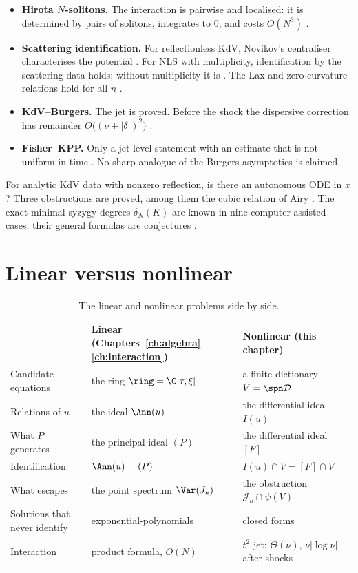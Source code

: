 \begin{itemize}
\item \textbf{Hirota $N$-solitons.} The interaction is pairwise and localised: it is determined by pairs of solitons, integrates to $0$, and costs $O(N^3)$  \proved.
\item \textbf{Scattering identification.} For reflectionless KdV, Novikov's centraliser characterises the potential  \proved. For NLS with multiplicity, identification by the scattering data holds; without multiplicity it is \falsest. The Lax and zero-curvature relations hold for all $n$  \proved.
\item \textbf{KdV--Burgers.} The jet is proved. Before the shock the dispersive correction has remainder $O\big((\nu+|\delta|)^2\big)$  .
\item \textbf{Fisher--KPP.} Only a jet-level statement with an estimate that is not uniform in time  \proved. No sharp analogue of the Burgers asymptotics is claimed.
\end{itemize}

\begin{caution}[title={Open in the nonlinear part}]
For analytic KdV data with nonzero reflection, is there an autonomous ODE in $x$? Three obstructions are proved, among them the cubic relation of Airy \openq{} . The exact minimal syzygy degrees $\delta_N(K)$ are known in nine computer-assisted cases; their general formulas are conjectures \openq{} .
\end{caution}

\section{Linear versus nonlinear}

\begin{table}[!htb]
\centering\small
\begin{tabular}{@{}L{3.0cm}L{5.8cm}L{5.8cm}@{}}
\toprule
 & Linear (Chapters~\ref{ch:algebra}--\ref{ch:interaction}) & Nonlinear (this chapter)\\\midrule
Candidate equations & the ring $\ring=\C[\tau,\xi]$ & a finite dictionary $V=\spn\mathcal D$\\
Relations of $u$ & the ideal $\Ann(u)$ & the differential ideal $I(u)$\\
What $P$ generates & the principal ideal $(P)$ & the differential ideal $[F]$\\
Identification & $\Ann(u)=(P)$ & $I(u)\cap V=[F]\cap V$\\
What escapes & the point spectrum $\Var(J_u)$ & the obstruction $\mathcal J_u\cap\psi(V)$\\
Solutions that never identify & exponential-polynomials & closed forms\\
Interaction & product formula, $O(N)$ & $t^2$ jet; $\Theta(\nu)$, $\nu|\log\nu|$ after shocks\\
\bottomrule
\end{tabular}
\caption{The linear and nonlinear problems side by side.}\label{tab:lin-nonlin}
\end{table}

